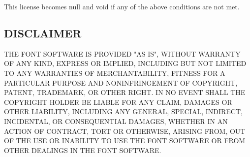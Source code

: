 \documentclass[12pt,a4paper,openany]{article}
\begin{document}
This license becomes null and void if any of the above conditions are
not met.

\subsection*{DISCLAIMER}

THE FONT SOFTWARE IS PROVIDED "AS IS", WITHOUT WARRANTY OF ANY KIND,
EXPRESS OR IMPLIED, INCLUDING BUT NOT LIMITED TO ANY WARRANTIES OF
MERCHANTABILITY, FITNESS FOR A PARTICULAR PURPOSE AND NONINFRINGEMENT
OF COPYRIGHT, PATENT, TRADEMARK, OR OTHER RIGHT. IN NO EVENT SHALL THE
COPYRIGHT HOLDER BE LIABLE FOR ANY CLAIM, DAMAGES OR OTHER LIABILITY,
INCLUDING ANY GENERAL, SPECIAL, INDIRECT, INCIDENTAL, OR CONSEQUENTIAL
DAMAGES, WHETHER IN AN ACTION OF CONTRACT, TORT OR OTHERWISE, ARISING
FROM, OUT OF THE USE OR INABILITY TO USE THE FONT SOFTWARE OR FROM
OTHER DEALINGS IN THE FONT SOFTWARE.
\end{document}
